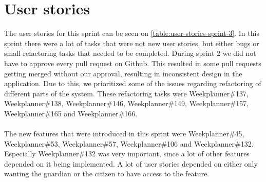 \section{User stories}
The user stories for this sprint can be seen on \autoref{table:user-stories-sprint-3}.
In this sprint there were a lot of tasks that were not new user stories, but either bugs or small refactoring tasks that needed to be completed.
During sprint 2 we did not have to approve every pull request on Github. 
This resulted in some pull requests getting merged without our approval, resulting in inconsistent design in the application.
Due to this, we prioritized some of the issues regarding refactoring of different parts of the system.
These refactoring tasks were Weekplanner\#137, Weekplanner\#138, Weekplanner\#146, Weekplanner\#149, Weekplanner\#157, Weekplanner\#165 and Weekplanner\#166.
\\\\
The new features that were introduced in this sprint were Weekplanner\#45, Weekplanner\#53, Weekplanner\#57, Weekplanner\#106 and Weekplanner\#132.
Especially Weekplanner\#132 was very important, since a lot of other features depended on it being implemented. 
A lot of user stories depended on either only wanting the guardian or the citizen to have access to the feature.

